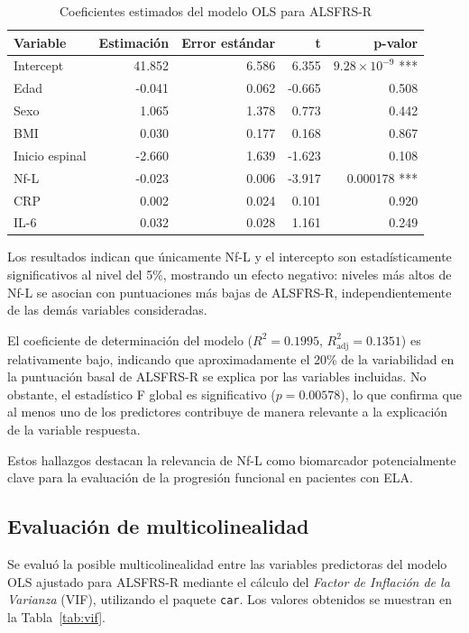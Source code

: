 \documentclass[12pt]{article} %
\begin{document}
\begin{table}[h!]
\centering
\caption{Coeficientes estimados del modelo OLS para ALSFRS-R}
\label{tab:ols_predictive}
\begin{tabular}{lrrrr}
\hline
\textbf{Variable} & \textbf{Estimación} & \textbf{Error estándar} & \textbf{t} & \textbf{p-valor} \\
\hline
Intercept      & 41.852 & 6.586 & 6.355 & $9.28\times10^{-9}$ *** \\
Edad           & -0.041 & 0.062 & -0.665 & 0.508 \\
Sexo           & 1.065 & 1.378 & 0.773 & 0.442 \\
BMI            & 0.030 & 0.177 & 0.168 & 0.867 \\
Inicio espinal & -2.660 & 1.639 & -1.623 & 0.108 \\
Nf-L           & -0.023 & 0.006 & -3.917 & 0.000178 *** \\
CRP            & 0.002 & 0.024 & 0.101 & 0.920 \\
IL-6           & 0.032 & 0.028 & 1.161 & 0.249 \\
\hline
\end{tabular}
\end{table}

Los resultados indican que únicamente Nf-L y el intercepto son estadísticamente significativos al nivel del 5\%, mostrando un efecto negativo: niveles más altos de Nf-L se asocian con puntuaciones más bajas de ALSFRS-R, independientemente de las demás variables consideradas. 

El coeficiente de determinación del modelo ($R^2 = 0.1995$, $R^2_\text{adj} = 0.1351$) es relativamente bajo, indicando que aproximadamente el 20\% de la variabilidad en la puntuación basal de ALSFRS-R se explica por las variables incluidas. No obstante, el estadístico F global es significativo ($p = 0.00578$), lo que confirma que al menos uno de los predictores contribuye de manera relevante a la explicación de la variable respuesta. 

Estos hallazgos destacan la relevancia de Nf-L como biomarcador potencialmente clave para la evaluación de la progresión funcional en pacientes con ELA.

\subsection{Evaluación de multicolinealidad}

Se evaluó la posible multicolinealidad entre las variables predictoras del modelo OLS ajustado para ALSFRS-R mediante el cálculo del \emph{Factor de Inflación de la Varianza} (VIF), utilizando el paquete \texttt{car}. Los valores obtenidos se muestran en la Tabla~\ref{tab:vif}.
\end{document}

